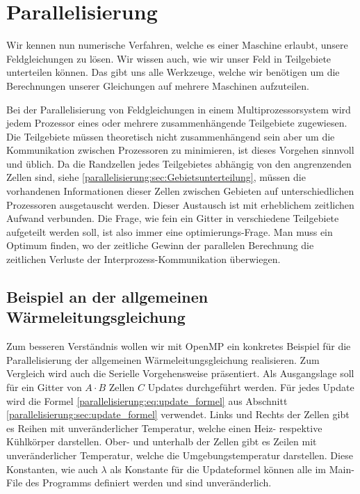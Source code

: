 %
%
%
%
\section{Parallelisierung
	\label{parallelisierung:sec:Parallelisierung}}
Wir kennen nun numerische Verfahren, welche es einer Maschine erlaubt, unsere Feldgleichungen zu lösen.
Wir wissen auch, wie wir unser Feld in Teilgebiete unterteilen können.
Das gibt uns alle Werkzeuge, welche wir benötigen um die Berechnungen unserer Gleichungen auf mehrere Maschinen aufzuteilen.

Bei der Parallelisierung von Feldgleichungen in einem Multiprozessorsystem wird jedem Prozessor eines oder mehrere zusammenhängende Teilgebiete zugewiesen.
Die Teilgebiete müssen theoretisch nicht zusammenhängend sein aber um die Kommunikation zwischen Prozessoren zu minimieren, ist dieses Vorgehen sinnvoll und üblich.
Da die Randzellen jedes Teilgebietes abhängig von den angrenzenden Zellen sind, siehe \ref{parallelisierung:sec:Gebietsunterteilung}, müssen die vorhandenen Informationen dieser Zellen zwischen Gebieten auf unterschiedlichen Prozessoren ausgetauscht werden.
Dieser Austausch ist mit erheblichem zeitlichen Aufwand verbunden.
Die Frage, wie fein ein Gitter in verschiedene Teilgebiete aufgeteilt werden soll, ist also immer eine optimierungs-Frage.
Man muss ein Optimum finden, wo der zeitliche Gewinn der parallelen Berechnung die zeitlichen Verluste der Interprozess-Kommunikation überwiegen.




\subsection{Beispiel an der allgemeinen Wärmeleitungsgleichung
	\label{parallelisierung:sub:BeispielParallelisierung}}
Zum besseren Verständnis wollen wir mit OpenMP ein konkretes Beispiel für die Parallelisierung der allgemeinen Wärmeleitungsgleichung realisieren.
Zum Vergleich wird auch die Serielle Vorgehensweise präsentiert.
Als Ausgangslage soll für ein Gitter von $A \cdot B$ Zellen $C$ Updates durchgeführt werden.
Für jedes Update wird die Formel \ref{parallelisierung:eq:update_formel} aus Abschnitt \ref{parallelisierung:sec:update_formel} verwendet.
Links und Rechts der Zellen gibt es Reihen mit unveränderlicher Temperatur, welche einen Heiz- respektive Kühlkörper darstellen.
Ober- und unterhalb der Zellen gibt es Zeilen mit unveränderlicher Temperatur, welche die Umgebungstemperatur darstellen.
Diese Konstanten, wie auch $\lambda$ als Konstante für die Updateformel können alle im Main-File des Programms definiert werden und sind unveränderlich.

